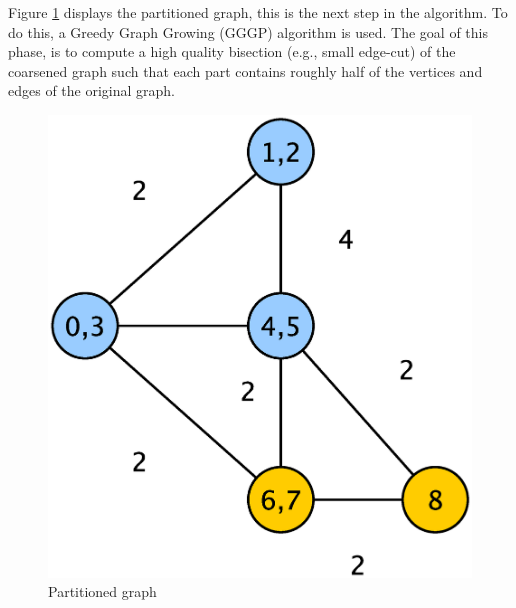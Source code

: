 \documentclass[abstract=on,9pt,twocolumn]{scrartcl}
\begin{document}
Figure \ref{img:part_graph} displays the partitioned graph, this is the next step in the algorithm. To do this, a Greedy Graph Growing (GGGP) algorithm is used.\cite{Karypis:1998:FHQ:305219.305248} The goal of this phase, is to compute a high quality bisection (e.g., small edge-cut) of the coarsened graph such that each part contains roughly half of the vertices and edges of the original graph.
\begin{center}
  \begin{figure}[htb]
    \includegraphics[width=\columnwidth]{img/partition.eps}
    \caption{Partitioned graph}
    \label{img:part_graph}
  \end{figure}
\end{center}
\end{document}
